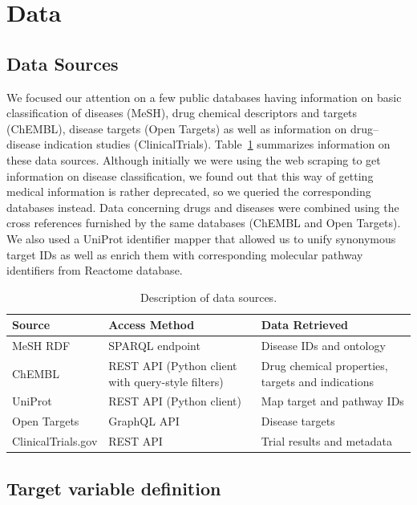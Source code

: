 \section{Data}

\subsection{Data Sources}

We focused our attention on a few public databases having information on basic classification of diseases (MeSH),
 drug chemical descriptors and targets (ChEMBL), disease targets (Open Targets) as well as information on
  drug--disease indication studies (ClinicalTrials).
 Table~\ref{tab:data_sources} summarizes information on these data sources. Although initially we were using the web
 scraping to get information on disease classification, we found out that this way of getting medical 
 information is rather deprecated, so we queried the corresponding databases instead. Data concerning drugs and diseases
were combined using the cross references furnished by the same databases (ChEMBL and Open Targets). We also used a UniProt identifier mapper
that allowed us to unify synonymous target IDs as well as enrich them with corresponding 
molecular pathway identifiers from Reactome database.

\begin{table}[H]
    \centering
    \caption{Description of data sources.}
    \label{tab:data_sources}
    \begin{tabular}{p{3cm} p{5cm} p{6cm}}
        \toprule
        \textbf{Source} & \textbf{Access Method} & \textbf{Data Retrieved} \\
        \midrule
        MeSH RDF & SPARQL endpoint & Disease IDs and ontology \\
        ChEMBL & REST API (Python client with query-style filters) & Drug chemical properties, targets and indications\\
        UniProt & REST API (Python client) & Map target and pathway IDs\\
        Open Targets & GraphQL API  & Disease targets\\
        ClinicalTrials.gov & REST API & Trial results and metadata\\
        \bottomrule
    \end{tabular}
\end{table}

\subsection{Target variable definition}


